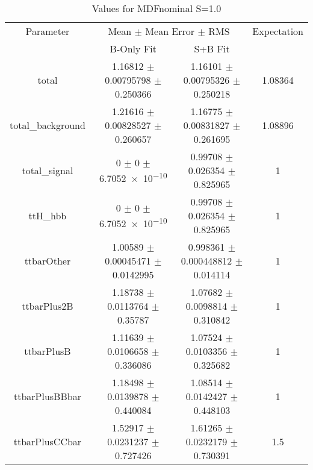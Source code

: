 \begin{table}
\centering
\caption{Values for MDFnominal S=1.0}
\begin{tabular}{cccc}
\toprule
Parameter & \multicolumn{2}{c}{Mean $\pm$ Mean Error $\pm$ RMS} & Expectation\\
 & B-Only Fit & S+B Fit & \\
\midrule
total & \num{1.16812} $\pm$ \num{0.00795798} $\pm$ \num{0.250366} & \num{1.16101} $\pm$ \num{0.00795326} $\pm$ \num{0.250218} & \num{1.08364}\\
total\_background & \num{1.21616} $\pm$ \num{0.00828527} $\pm$ \num{0.260657} & \num{1.16775} $\pm$ \num{0.00831827} $\pm$ \num{0.261695} & \num{1.08896}\\
total\_signal & \num{0} $\pm$ \num{0} $\pm$ \num{6.7052e-10} & \num{0.99708} $\pm$ \num{0.026354} $\pm$ \num{0.825965} & \num{1}\\
ttH\_hbb & \num{0} $\pm$ \num{0} $\pm$ \num{6.7052e-10} & \num{0.99708} $\pm$ \num{0.026354} $\pm$ \num{0.825965} & \num{1}\\
ttbarOther & \num{1.00589} $\pm$ \num{0.00045471} $\pm$ \num{0.0142995} & \num{0.998361} $\pm$ \num{0.000448812} $\pm$ \num{0.014114} & \num{1}\\
ttbarPlus2B & \num{1.18738} $\pm$ \num{0.0113764} $\pm$ \num{0.35787} & \num{1.07682} $\pm$ \num{0.0098814} $\pm$ \num{0.310842} & \num{1}\\
ttbarPlusB & \num{1.11639} $\pm$ \num{0.0106658} $\pm$ \num{0.336086} & \num{1.07524} $\pm$ \num{0.0103356} $\pm$ \num{0.325682} & \num{1}\\
ttbarPlusBBbar & \num{1.18498} $\pm$ \num{0.0139878} $\pm$ \num{0.440084} & \num{1.08514} $\pm$ \num{0.0142427} $\pm$ \num{0.448103} & \num{1}\\
ttbarPlusCCbar & \num{1.52917} $\pm$ \num{0.0231237} $\pm$ \num{0.727426} & \num{1.61265} $\pm$ \num{0.0232179} $\pm$ \num{0.730391} & \num{1.5}\\
\bottomrule
\end{tabular}
\end{table}
